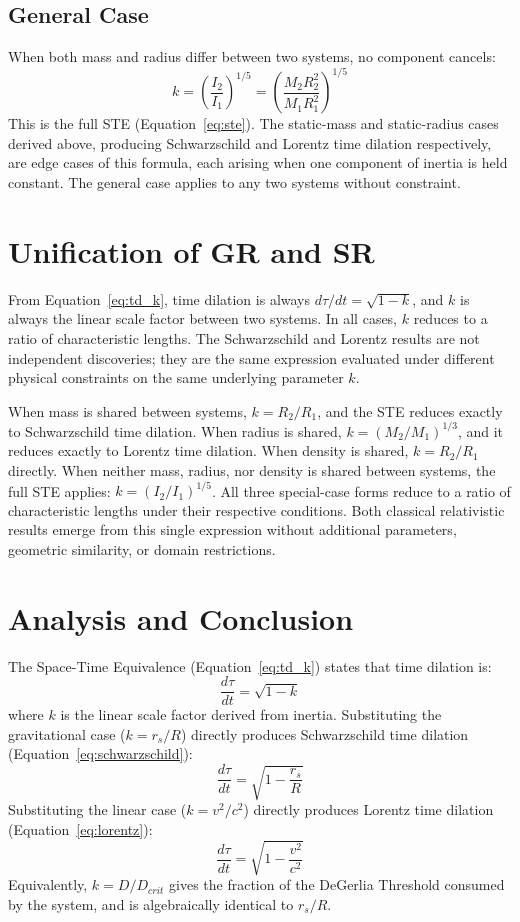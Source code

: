 \documentclass[a4paper,11pt]{article}
\begin{document}
\subsection{General Case}
When both mass and radius differ between two systems, no component cancels:
\begin{equation}
k = \left(\frac{I_2}{I_1}\right)^{1/5} = \left(\frac{M_2 R_2^2}{M_1 R_1^2}\right)^{1/5}
\end{equation}
This is the full STE (Equation~\ref{eq:ste}). The static-mass and static-radius cases derived above, producing Schwarzschild and Lorentz time dilation respectively, are edge cases of this formula, each arising when one component of inertia is held constant. The general case applies to any two systems without constraint.

\section{Unification of GR and SR}
From Equation~\ref{eq:td_k}, time dilation is always $d\tau/dt = \sqrt{1-k}$, and $k$ is always the linear scale factor between two systems. In all cases, $k$ reduces to a ratio of characteristic lengths. The Schwarzschild and Lorentz results are not independent discoveries; they are the same expression evaluated under different physical constraints on the same underlying parameter $k$.

When mass is shared between systems, $k = R_2/R_1$, and the STE reduces exactly to Schwarzschild time dilation. When radius is shared, $k = (M_2/M_1)^{1/3}$, and it reduces exactly to Lorentz time dilation. When density is shared, $k = R_2/R_1$ directly. When neither mass, radius, nor density is shared between systems, the full STE applies: $k = (I_2/I_1)^{1/5}$. All three special-case forms reduce to a ratio of characteristic lengths under their respective conditions. Both classical relativistic results emerge from this single expression without additional parameters, geometric similarity, or domain restrictions.

\section{Analysis and Conclusion}
The Space-Time Equivalence (Equation~\ref{eq:td_k}) states that time dilation is:
\[
\frac{d\tau}{dt} = \sqrt{1 - k}
\]
where $k$ is the linear scale factor derived from inertia. Substituting the gravitational case ($k = r_s/R$) directly produces Schwarzschild time dilation (Equation~\ref{eq:schwarzschild}):
\[
\frac{d\tau}{dt} = \sqrt{1 - \frac{r_s}{R}}
\]
Substituting the linear case ($k = v^2/c^2$) directly produces Lorentz time dilation (Equation~\ref{eq:lorentz}):
\[
\frac{d\tau}{dt} = \sqrt{1 - \frac{v^2}{c^2}}
\]
Equivalently, $k = D/D_{crit}$ gives the fraction of the DeGerlia Threshold consumed by the system, and is algebraically identical to $r_s/R$.
\end{document}
